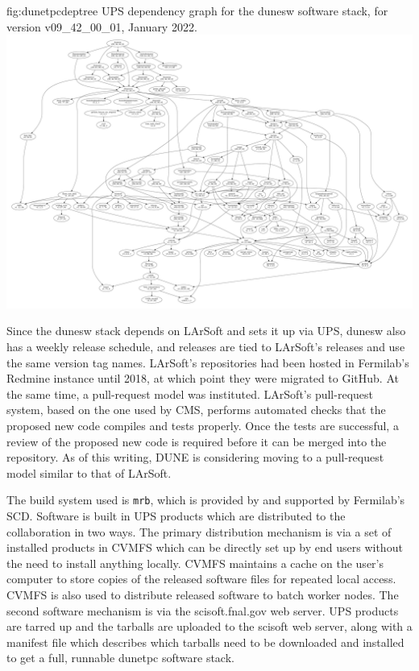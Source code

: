 \documentclass[../main-v1.tex]{subfiles}
\begin{document}
\begin{dunefigure}
{fig:dunetpcdeptree}
{UPS dependency graph for the dunesw software stack, for version v09\_42\_00\_01, January 2022.}
\includegraphics[width=\textwidth]{graphics/CodeManagementFigures/dunesw_v09_42_00_01_graph.pdf}
\end{dunefigure}

Since the dunesw stack depends on LArSoft and sets it up via UPS, dunesw also has a weekly release schedule, and releases are tied to LArSoft's releases and use the same version tag names.  LArSoft's repositories had been hosted in Fermilab's Redmine instance until 2018, at which point they were migrated to GitHub.  At the same time, a pull-request model was instituted.  LArSoft's pull-request system, based on the one used by CMS, performs automated checks that the proposed new code compiles and tests properly.  Once the tests are successful, a review of the proposed new code is required before it can be merged into the repository.  As of this writing, DUNE is considering moving to a pull-request model similar to that of LArSoft.

The build system used is {\tt mrb}, which is provided by and supported by Fermilab's SCD.  Software is built in UPS products which are distributed to the collaboration in two ways.  The primary distribution mechanism is via a set of installed products in CVMFS which can be directly set up by end users without the need to install anything locally.  CVMFS maintains a cache on the user's computer to store copies of the released software files for repeated local access.  CVMFS is also used to distribute released software to batch worker nodes.  The second software mechanism is via the scisoft.fnal.gov web server.  UPS products are tarred up and the tarballs are uploaded to the scisoft web server, along with a manifest file which describes which tarballs need to be downloaded and installed to get a full, runnable dunetpc software stack.
\end{document}

